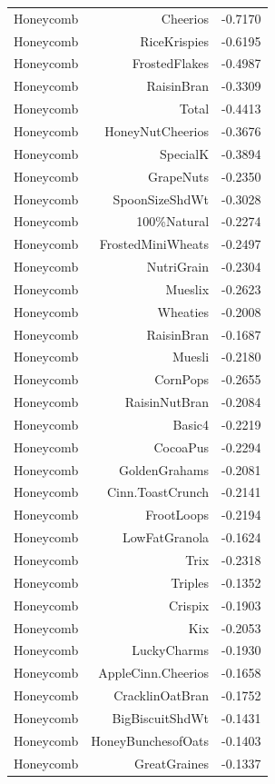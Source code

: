 \begin{longtable}{@{}lrr@{}}
Honeycomb & Cheerios & -0.7170 \\
Honeycomb & RiceKrispies & -0.6195 \\
Honeycomb & FrostedFlakes & -0.4987 \\
Honeycomb & RaisinBran & -0.3309 \\
Honeycomb & Total & -0.4413 \\
Honeycomb & HoneyNutCheerios & -0.3676 \\
Honeycomb & SpecialK & -0.3894 \\
Honeycomb & GrapeNuts & -0.2350 \\
Honeycomb & SpoonSizeShdWt & -0.3028 \\
Honeycomb & 100\%Natural & -0.2274 \\
Honeycomb & FrostedMiniWheats & -0.2497 \\
Honeycomb & NutriGrain & -0.2304 \\
Honeycomb & Mueslix & -0.2623 \\
Honeycomb & Wheaties & -0.2008 \\
Honeycomb & RaisinBran & -0.1687 \\
Honeycomb & Muesli & -0.2180 \\
Honeycomb & CornPops & -0.2655 \\
Honeycomb & RaisinNutBran & -0.2084 \\
Honeycomb & Basic4 & -0.2219 \\
Honeycomb & CocoaPus & -0.2294 \\
Honeycomb & GoldenGrahams & -0.2081 \\
Honeycomb & Cinn.ToastCrunch & -0.2141 \\
Honeycomb & FrootLoops & -0.2194 \\
Honeycomb & LowFatGranola & -0.1624 \\
Honeycomb & Trix & -0.2318 \\
Honeycomb & Triples & -0.1352 \\
Honeycomb & Crispix & -0.1903 \\
Honeycomb & Kix & -0.2053 \\
Honeycomb & LuckyCharms & -0.1930 \\
Honeycomb & AppleCinn.Cheerios & -0.1658 \\
Honeycomb & CracklinOatBran & -0.1752 \\
Honeycomb & BigBiscuitShdWt & -0.1431 \\
Honeycomb & HoneyBunchesofOats & -0.1403 \\
Honeycomb & GreatGraines & -0.1337 \\

\end{longtable}
